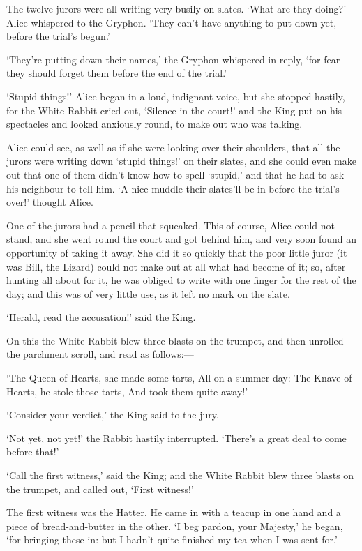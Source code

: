 \documentclass[12pt]{article}
\begin{document}
\begin{Parallel}[p]{}{}
{The twelve jurors were all writing very busily on slates. ‘What are they doing?’ Alice whispered to the Gryphon. ‘They can’t have anything to put down yet, before the trial’s begun.’

‘They’re putting down their names,’ the Gryphon whispered in reply, ‘for fear they should forget them before the end of the trial.’

‘Stupid things!’ Alice began in a loud, indignant voice, but she stopped hastily, for the White Rabbit cried out, ‘Silence in the court!’ and the King put on his spectacles and looked anxiously round, to make out who was talking.

Alice could see, as well as if she were looking over their shoulders, that all the jurors were writing down ‘stupid things!’ on their slates, and she could even make out that one of them didn’t know how to spell ‘stupid,’ and that he had to ask his neighbour to tell him. ‘A nice muddle their slates’ll be in before the trial’s over!’ thought Alice.

One of the jurors had a pencil that squeaked. This of course, Alice could not stand, and she went round the court and got behind him, and very soon found an opportunity of taking it away. She did it so quickly that the poor little juror (it was Bill, the Lizard) could not make out at all what had become of it; so, after hunting all about for it, he was obliged to write with one finger for the rest of the day; and this was of very little use, as it left no mark on the slate.

‘Herald, read the accusation!’ said the King.

On this the White Rabbit blew three blasts on the trumpet, and then unrolled the parchment scroll, and read as follows:—

   ‘The Queen of Hearts, she made some tarts,
      All on a summer day:
    The Knave of Hearts, he stole those tarts,
      And took them quite away!’

‘Consider your verdict,’ the King said to the jury.

‘Not yet, not yet!’ the Rabbit hastily interrupted. ‘There’s a great deal to come before that!’

‘Call the first witness,’ said the King; and the White Rabbit blew three blasts on the trumpet, and called out, ‘First witness!’

The first witness was the Hatter. He came in with a teacup in one hand and a piece of bread-and-butter in the other. ‘I beg pardon, your Majesty,’ he began, ‘for bringing these in: but I hadn’t quite finished my tea when I was sent for.’

}
\end{Parallel}
\end{document}
